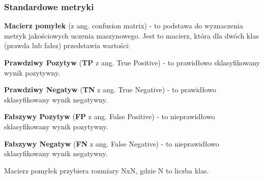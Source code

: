 \subsubsection{Standardowe metryki}
\begin{description}
\item \textbf{Macierz pomyłek} (z ang. confusion matrix) - to podstawa do wyznaczenia metryk jakościowych uczenia maszynowego. Jest to macierz, która dla dwóch klas (prawda lub fałsz) przedstawia wartości:
\begin{description}
\item \textbf{Prawdziwy Pozytyw} (\textbf{TP} z ang. True Positive) - to prawidłowo sklasyfikowany wynik pozytywny.
\item \textbf{Prawdziwy Negatyw} (\textbf{TN} z ang. True Negative) - to prawidłowo sklasyfikowany wynik negatywny.
\item \textbf{Fałszywy Pozytyw} (\textbf{FP} z ang. False Positive) - to nieprawidłowo sklasyfikowany wynik pozytywny.
\item \textbf{Fałszywy Negatyw} (\textbf{FN} z ang. False Negative) - to nieprawidłowo sklasyfikowany wynik negatywny.
\end{description}

Macierz pomyłek przybiera rozmiary NxN, gdzie N to liczba klas.


\end{description}
